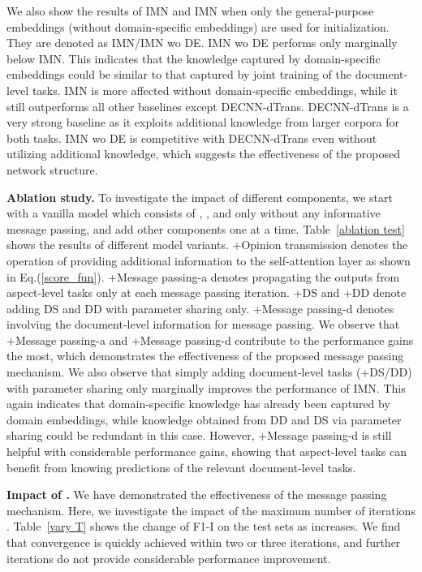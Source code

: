 \documentclass[11pt,a4paper]{article}
\begin{document}
 We also show the results of IMN and IMN when only the general-purpose embeddings (without domain-specific embeddings) are used for initialization. They are denoted as IMN/IMN wo DE. IMN wo DE performs only marginally below IMN. This indicates that the knowledge captured by domain-specific embeddings could be similar to that captured by joint training of the document-level tasks. IMN is more affected without domain-specific embeddings, while it still outperforms all other baselines except DECNN-dTrans. DECNN-dTrans is a very strong baseline as it exploits additional knowledge from larger corpora for both tasks. IMN wo DE is competitive with DECNN-dTrans even without utilizing additional knowledge, which suggests the effectiveness of the proposed network structure. 
\medskip


\noindent\textbf{Ablation study.} To investigate the impact of different components, we start with a vanilla model which consists of , , and  only without any informative message passing, and add other components one at a time. Table~\ref{ablation test} shows the results of different model variants. +Opinion transmission denotes the operation of providing additional information  to the self-attention layer as shown in Eq.(\ref{score_fun}). +Message passing-a denotes propagating the outputs from aspect-level tasks only at each message passing iteration. +DS and +DD denote adding DS and DD with parameter sharing only.  +Message passing-d denotes involving the document-level information for message passing.  We observe that +Message passing-a and +Message passing-d contribute to the performance gains the most, which demonstrates the effectiveness of the proposed message passing mechanism. We also observe that simply adding document-level tasks (+DS/DD) with parameter sharing only marginally improves the performance of IMN. This again indicates that domain-specific knowledge has already been captured by domain embeddings, while knowledge obtained from DD and DS via parameter sharing could be redundant in this case. However, +Message passing-d is still helpful with considerable performance gains, showing that aspect-level tasks can benefit from knowing predictions of the relevant document-level tasks. 
\medskip

\noindent\textbf{Impact of .}
We have demonstrated the effectiveness of the message passing mechanism. Here, we investigate the impact of the maximum number of iterations . Table~\ref{vary T} shows the change of F1-I on the test sets as  increases. We find that convergence is quickly achieved within two or three iterations, and further iterations do not provide considerable performance improvement. 
\medskip
\end{document}
